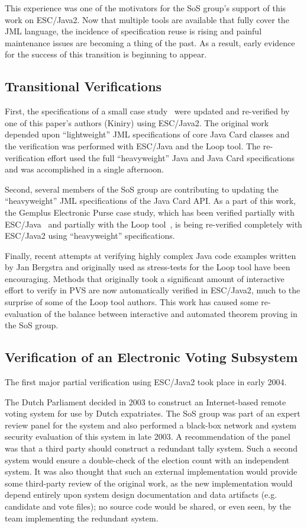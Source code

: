 \documentclass{llncs}
\begin{document}
This experience was one of the motivators for the SoS group's support
of this work on ESC/Java2.  Now that multiple tools are available that
fully cover the JML language, the incidence of specification reuse is
rising and painful maintenance issues are becoming a thing of the
past.  As a result, early evidence for the success of this transition
is beginning to appear.

\subsection{Transitional Verifications}

First, the specifications of a small case
study~\cite{BreunesseJacobsBerg02} were updated and re-verified by one
of this paper's authors (Kiniry) using ESC/Java2.  The original work
depended upon ``light\-weight'' JML specifications of core Java Card
classes and the verification was performed with ESC/Java and
the Loop tool.  The re-verification effort used the full
``heavyweight'' Java and Java Card specifications and was accomplished
in a single afternoon.

Second, several members of the SoS group are contributing to updating
the ``heavyweight'' JML specifications of the Java Card API.  As a
part of this work, the Gemplus Electronic Purse case study, which has
been verified partially with ESC/Java~\cite{CatanoHuisman02} and
partially with the Loop tool~\cite{BreunesseJacobsBerg02}, is being
re-verified completely with ESC/Java2 using ``heavyweight''
specifications.

Finally, recent attempts at verifying highly complex Java code
examples written by Jan Bergstra and originally used as stress-tests
for the Loop tool have been encouraging.  Methods that originally took
a significant amount of interactive effort to verify in PVS are now
automatically verified in ESC/Java2, much to the surprise of some of
the Loop tool authors.  This work has caused some re-evaluation of the
balance between interactive and automated theorem proving in the SoS
group.

\subsection{Verification of an Electronic Voting Subsystem}

The first major partial verification using ESC/Java2 took place in
early 2004.

The Dutch Parliament decided in 2003 to construct an Internet-based
remote voting system for use by Dutch expatriates.  The SoS group was
part of an expert review panel for the system and also performed a
black-box network and system security evaluation of this system in
late 2003.  A recommendation of the panel was that a third party
should construct a redundant tally system.  Such a second system would
ensure a double-check of the election count with an independent
system.  It was also thought that such an external implementation
would provide some third-party review of the original work, as the new
implementation would depend entirely upon system design documentation
and data artifacts (e.g. candidate and vote files); no source code
would be shared, or even seen, by the team implementing the redundant
system.
\end{document}
